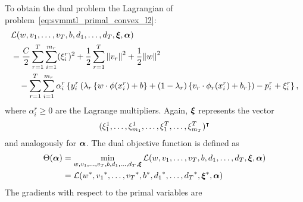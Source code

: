  To obtain the dual problem the Lagrangian of problem~\eqref{eq:svmmtl_primal_convex_l2}:
\begin{equation}\label{eq:svmmtl_lagrangian_convex_l2}
    \begin{aligned}
        & \lagr({w}, {v}_1, \ldots, {v}_\ntasks, b, d_1, \ldots, d_\ntasks, \fv{\xi}, \fv{\alpha}) \\
        &=  \frac{C}{2} \sum_{r= 1}^T \sum_{i=1}^{m_r} ({\xi_{i}^r})^2 + \frac{1}{2} \sum_{r= 1}^T{\norm{{v}_r}^2} + \frac{1}{2} {\norm{{w}}}^2 \\
        &\quad -  \sum_{r= 1}^T \sum_{i=1}^{m_r} \alpha_i^r \left\lbrace y_{i}^r  \left(\lambda_r \left\lbrace {w} \cdot \phi(x_{i}^r) + b  \right\rbrace + (1 - \lambda_r) \left\lbrace {v}_r \cdot \phi_r(x_{i}^r) + b_r \right\rbrace  \right) - p_{i}^r + \xi_{i}^r  \right\rbrace ,
    \end{aligned}
\end{equation}
where $\alpha_i^r \geq 0$ are the Lagrange multipliers. Again, $\bm{\xi}$ represents the vector $$(\xi_1^1, \ldots, \xi_{m_1}^1, \ldots, \xi_1^T, \ldots, \xi_{m_T}^T)^\intercal$$ and analogously for $\bm{\alpha}$. The dual objective function is defined as 
\begin{equation}\nonumber
    \begin{aligned}
         \Theta(\bm{\alpha}) &=  \min_{{w}, {v}_1, \ldots, {v}_T, b, d_1, \ldots, d_T, \bm{\xi}} \mathcal{L}({w}, {v}_1, \ldots, {v}_T, b, d_1, \ldots, d_T, \bm{\xi}, \bm{\alpha}) \\
         &= \mathcal{L}({{w}}^*, {{v}_1}^*, \ldots, {{v}_T}^*, {b}^*, {d_1}^*, \ldots, {d_T}^*, {\bm{\xi}}^*, \bm{\alpha})
    \end{aligned}    
\end{equation}
The gradients with respect to the primal variables are
